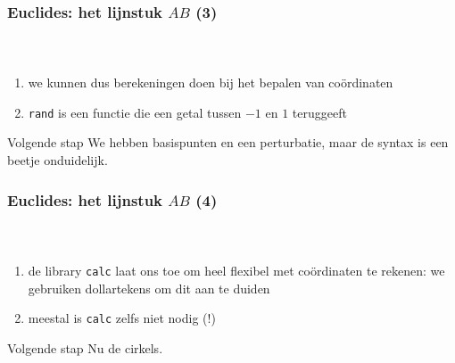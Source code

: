 \begin{frame}
  \frametitle{Euclides: het lijnstuk $AB$ (3)}

  \begin{columns}
    \begin{column}{.67\textwidth}
      \inputminted[fontsize = \scriptsize]{latex}{tikz/triangle/1c.tikz}
    \end{column}
    \begin{column}{.33\textwidth}
      
    \end{column}
  \end{columns}

  \footnotesize
  \begin{enumerate}
    \item\pause we kunnen dus berekeningen doen bij het bepalen van co\"ordinaten
    \item\pause \texttt{rand} is een functie die een getal tussen $-1$ en $1$ teruggeeft
  \end{enumerate}
  \pause
  \begin{block}{Volgende stap}
    We hebben basispunten en een perturbatie, maar de syntax is een beetje onduidelijk.
  \end{block}
\end{frame}

\begin{frame}
  \frametitle{Euclides: het lijnstuk $AB$ (4)}

  \begin{columns}
    \begin{column}{.67\textwidth}
      \inputminted[fontsize = \scriptsize]{latex}{tikz/triangle/1d.tikz}
    \end{column}
    \begin{column}{.33\textwidth}
      
    \end{column}
  \end{columns}

  \footnotesize
  \begin{enumerate}
    \item\pause de library \texttt{calc} laat ons toe om heel flexibel met co\"ordinaten te rekenen: we gebruiken dollartekens om dit aan te duiden
    \item\pause meestal is \texttt{calc} zelfs niet nodig (!)
  \end{enumerate}
  \pause
  \begin{block}{Volgende stap}
    Nu de cirkels.
  \end{block}
\end{frame}

